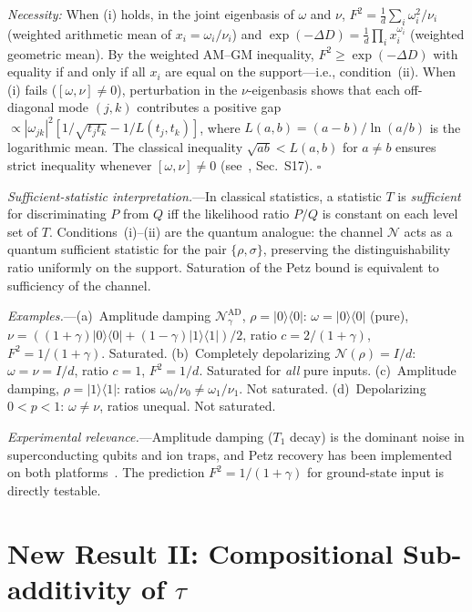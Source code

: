 \documentclass[prl,twocolumn,superscriptaddress,longbibliography,floatfix]{revtex4-2}
\newcommand{\chan}{\mathcal{N}}
\newcommand{\ket}[1]{|#1\rangle}
\newcommand{\bra}[1]{\langle#1|}
\newcommand{\tauasym}{\tau}
\begin{document}
\emph{Necessity:}
When (i) holds, in the joint eigenbasis of $\omega$ and $\nu$,
$F^2 = \tfrac{1}{d}\sum_i \omega_i^2/\nu_i$
(weighted arithmetic mean of $x_i = \omega_i/\nu_i$)
and $\exp(-\Delta D) = \tfrac{1}{d}\prod_i x_i^{\omega_i}$
(weighted geometric mean).  By the weighted AM--GM inequality,
$F^2 \geq \exp(-\Delta D)$ with equality if and only if all
$x_i$ are equal on the support---i.e., condition~(ii).
When (i) fails ($[\omega,\nu]\neq 0$), perturbation in the
$\nu$-eigenbasis shows that each off-diagonal mode $(j,k)$
contributes a positive gap
$\propto |\omega_{jk}|^2 [1/\sqrt{t_j t_k} - 1/L(t_j,t_k)]$,
where $L(a,b) = (a-b)/\ln(a/b)$ is the logarithmic mean.
The classical inequality $\sqrt{ab} < L(a,b)$ for $a \neq b$
ensures strict inequality whenever $[\omega,\nu] \neq 0$
(see~\cite{SM}, Sec.~S17).
\hfill$\square$

\emph{Sufficient-statistic interpretation.}---In classical
statistics, a statistic $T$ is \emph{sufficient} for
discriminating $P$ from $Q$ iff the likelihood ratio $P/Q$ is
constant on each level set of $T$.  Conditions~(i)--(ii) are
the quantum analogue: the channel $\chan$ acts as a quantum
sufficient statistic for the pair $\{\rho, \sigma\}$,
preserving the distinguishability ratio uniformly on the
support. Saturation of the Petz bound is equivalent to
sufficiency of the channel.

\emph{Examples.}---(a)~Amplitude damping
$\chan_\gamma^{\mathrm{AD}}$, $\rho = \ket{0}\!\bra{0}$:
$\omega = \ket{0}\!\bra{0}$ (pure), $\nu = ((1\!+\!\gamma)\ket{0}\!\bra{0}
+ (1\!-\!\gamma)\ket{1}\!\bra{1})/2$, ratio $c = 2/(1+\gamma)$,
$F^2 = 1/(1+\gamma)$. Saturated.
(b)~Completely depolarizing $\chan(\rho) = I/d$:
$\omega = \nu = I/d$, ratio $c = 1$, $F^2 = 1/d$. Saturated
for \emph{all} pure inputs.
(c)~Amplitude damping, $\rho = \ket{1}\!\bra{1}$:
ratios $\omega_0/\nu_0 \neq \omega_1/\nu_1$. Not saturated.
(d)~Depolarizing $0 < p < 1$: $\omega \neq \nu$, ratios
unequal. Not saturated.

\emph{Experimental relevance.}---Amplitude damping ($T_1$ decay)
is the dominant noise in superconducting qubits and ion traps,
and Petz recovery has been implemented on both
platforms~\cite{Png2025,Singh2025}.  The prediction
$F^2 = 1/(1+\gamma)$ for ground-state input is directly
testable.

\section{New Result II: Compositional Sub-additivity of \texorpdfstring{$\tauasym$}{tau}}
\label{sec:composition}
\end{document}
